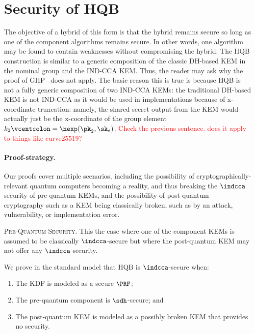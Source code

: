 \section{Security of HQB}\label{sec:hqb-proofs}

The objective of a hybrid of this form is that the hybrid remains secure so
long as one of the component algorithms remains secure. In other words, one
algorithm may be found to contain weaknesses without compromising the hybrid.
\newcommand{\defineequals}{\vcentcolon=}
The HQB construction is similar to a generic composition of the classic DH-based KEM in the nominal group and the IND-CCA KEM. Thus, the reader may ask why the proof of GHP~\cite{...} does not apply. The basic reason this is true is because HQB is not a fully generic composition of two IND-CCA KEMs: the traditional DH-based KEM is not IND-CCA as it would be used in implementations because of x-coordinate truncation: namely, the shared secret output from the KEM would actually just be the x-coordinate of the group element $k_2 \defineequals \nexp(\pk_2, \sk_e)$. \textcolor{red}{Check the previous sentence. does it apply to things like curve25519?}

\paragraph{Proof-strategy.}

Our proofs cover multiple scenarios, including the possibility of
cryptographically-relevant quantum computers becoming a reality, and thus
breaking the $\indcca$ security of pre-quantum KEMs, and the possibility of
post-quantum cryptography such as a KEM being classically broken, such as by
an attack, vulnerability, or implementation error.

\medskip \noindent
\textsc{Pre-Quantum Security.} This the case where one of the component
KEMs is assumed to be classically $\indcca$-secure but where the post-quantum
KEM may not offer any $\indcca$ security.

We prove in the standard model that HQB is $\indcca$-secure when:
\begin{enumerate}
\item The KDF is modeled as a secure $\PRF$;
\item The pre-quantum component is $\sdh$-secure; and
\item The post-quantum KEM is modeled as a possibly broken KEM that provides no security.
\end{enumerate}

